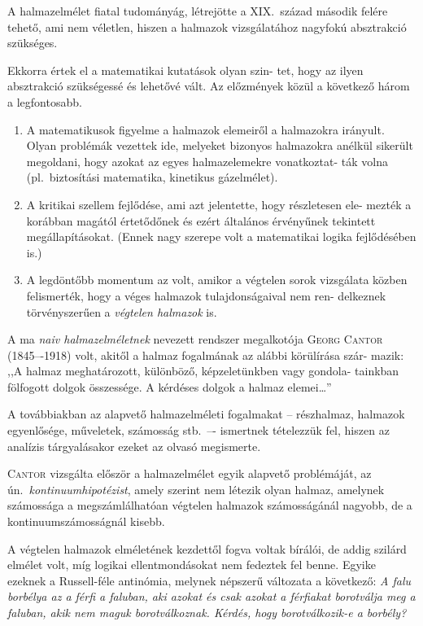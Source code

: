 \documentclass[a4paper,12pt]{article}
\begin{document}
A halmazelmélet fiatal tudományág, létrejötte a XIX.~század második
felére tehető, ami nem véletlen, hiszen a halmazok vizsgálatához nagyfokú
absztrakció szükséges.

Ekkorra értek el a matematikai kutatások olyan szin-
tet, hogy az ilyen absztrakció szükségessé és lehetővé vált. Az előzmények
közül a következő három a legfontosabb.

\begin{enumerate}
\item A matematikusok figyelme a halmazok elemeiről a halmazokra irányult.
Olyan problémák vezettek ide, melyeket bizonyos halmazokra anélkül
sikerült megoldani, hogy azokat az egyes halmazelemekre vonatkoztat-
ták volna (pl.~biztosítási matematika, kinetikus gázelmélet).

\item A kritikai szellem fejlődése, ami azt jelentette, hogy részletesen ele-
mezték a korábban magától értetődőnek és ezért általános érvényűnek
tekintett megállapításokat. (Ennek nagy szerepe volt a matematikai
logika fejlődésében is.)

\item A legdöntőbb momentum az volt, amikor a végtelen sorok vizsgálata
közben felismerték, hogy a véges halmazok tulajdonságaival nem ren-
delkeznek törvényszerűen a \emph{végtelen halmazok} is.
\end{enumerate}

A ma \emph{naiv halmazelméletnek} nevezett rendszer megalkotója \textsc{Georg Cantor}
(1845–-1918) volt, akitől a halmaz fogalmának az alábbi körülírása szár-
mazik: ,,A halmaz meghatározott, különböző, képzeletünkben vagy gondola-
tainkban fölfogott dolgok összessége. A kérdéses dolgok a halmaz elemei\dots''

A továbbiakban az alapvető halmazelméleti fogalmakat -- részhalmaz, halmazok
egyenlősége, műveletek, számosság stb.~–- ismertnek tételezzük fel, hiszen
az analízis tárgyalásakor ezeket az olvasó megismerte.

\textsc{Cantor} vizsgálta először a halmazelmélet egyik alapvető problémáját, az
ún.~\emph{kontinuumhipotézist}, amely szerint nem létezik olyan halmaz, amelynek
számossága a megszámlálhatóan végtelen halmazok számosságánál nagyobb,
de a kontinuumszámosságnál kisebb.

\bigskip
A végtelen halmazok elméletének kezdettől fogva voltak bírálói, de addig
szilárd elmélet volt, míg logikai ellentmondásokat nem fedeztek fel benne.
Egyike ezeknek a Russell-féle antinómia, melynek népszerű változata a következő:
\emph{A falu borbélya az a férfi a faluban, aki azokat és csak azokat a
férfiakat borotválja meg a faluban, akik nem maguk borotválkoznak. Kérdés,
hogy borotválkozik-e a borbély?}
\end{document}
